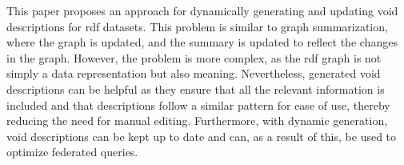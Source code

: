 This paper proposes an approach for dynamically generating and updating \gls{void} descriptions for \gls{rdf} datasets. This problem is similar to graph summarization, where the graph is updated, and the summary is updated to reflect the changes in the graph. However, the problem is more complex, as the \gls{rdf} graph is not simply a data representation but also meaning. Nevertheless, generated \gls{void} descriptions can be helpful as they ensure that all the relevant information is included and that descriptions follow a similar pattern for ease of use, thereby reducing the need for manual editing. Furthermore, with dynamic generation, \gls{void} descriptions can be kept up to date and can, as a result of this, be used to optimize federated queries.




